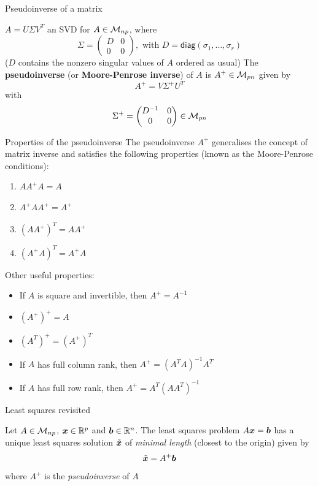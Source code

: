 \documentclass[aspectratio=169]{beamer}\usepackage[]{graphicx}\usepackage[]{xcolor}
\begin{document}


\begin{frame}{Pseudoinverse of a matrix}
\begin{importantdefinition}[Pseudoinverse]
$A=U\Sigma V^T$ an SVD for $A\in\mathcal{M}_{np}$, where 
\[
\Sigma = \begin{pmatrix}
D & 0 \\ 0 & 0
\end{pmatrix},
\textrm{ with }
D=\mathsf{diag}(\sigma_1,\ldots,\sigma_r)
\]
($D$ contains the nonzero singular values of $A$ ordered as usual)
\vskip0.5cm
The \textbf{pseudoinverse} (or \textbf{Moore-Penrose inverse}) of $A$ is $A^+\in\mathcal{M}_{pn}$ given by
\[
A^+ = V\Sigma^+ U^T
\]
with
\[
\Sigma^+ =
\begin{pmatrix}
D^{-1} & 0 \\ 0 & 0
\end{pmatrix}\in\mathcal{M}_{pn}
\]
\end{importantdefinition}
\end{frame}


\begin{frame}{Properties of the pseudoinverse}
The pseudoinverse $A^+$ generalises the concept of matrix inverse and satisfies the following properties (known as the Moore-Penrose conditions):
\begin{enumerate}
\item $AA^+A = A$
\item $A^+AA^+ = A^+$
\item $(AA^+)^T = AA^+$
\item $(A^+A)^T = A^+A$
\end{enumerate}
\vfill
Other useful properties:
\begin{itemize}
\item If $A$ is square and invertible, then $A^+ = A^{-1}$
\item $(A^+)^+ = A$
\item $(A^T)^+ = (A^+)^T$
\item If $A$ has full column rank, then $A^+ = (A^TA)^{-1}A^T$
\item If $A$ has full row rank, then $A^+ = A^T(AA^T)^{-1}$
\end{itemize}
\end{frame}



\begin{frame}{Least squares revisited}
\begin{importanttheorem}
Let $A\in\mathcal{M}_{np}$, $\bm{x}\in\mathbb{R}^p$ and $\bm{b}\in\mathbb{R}^n$. The least squares problem $A\bm{x}=\bm{b}$ has a unique least squares solution $\tilde{\bm{x}}$ of \emph{minimal length} (closest to the origin) given by
\[
\tilde{\bm{x}} = A^+\bm{b}
\]
where $A^+$ is the \emph{pseudoinverse} of $A$
\end{importanttheorem}
\end{frame}
\end{document}

